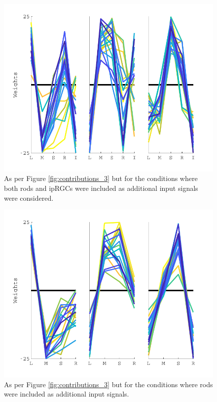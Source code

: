 \begin{figure}[htbp]
\includegraphics[max width=\textwidth]{figs/LargeSphere/contributions_5.pdf}
\caption{As per Figure \ref{fig:contributions_3} but for the conditions where both rods and ipRGCs were included as additional input signals were considered.} 
\label{fig:contributions_5}
\end{figure}

\begin{figure}[htbp]
\includegraphics[max width=\textwidth]{figs/LargeSphere/contributions_4.pdf}
\caption{As per Figure \ref{fig:contributions_3} but for the conditions where rods were included as additional input signals.} 
\label{fig:contributions_4}
\end{figure}

